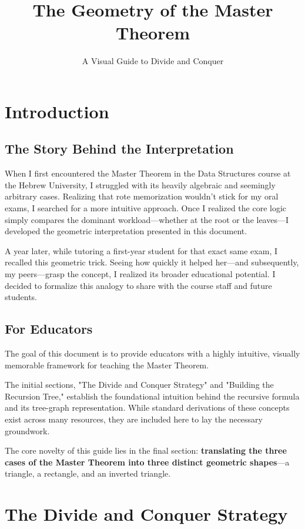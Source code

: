 \documentclass[11pt, a4paper]{article}
\title{\Huge \textbf{The Geometry of the Master Theorem}}
\author{A Visual Guide to Divide and Conquer}
\date{}
\begin{document}
\maketitle

\section*{Introduction}

\subsection*{The Story Behind the Interpretation}
When I first encountered the Master Theorem in the Data Structures course at the Hebrew University, I struggled with its heavily algebraic and seemingly arbitrary cases. Realizing that rote memorization wouldn't stick for my oral exams, I searched for a more intuitive approach. Once I realized the core logic simply compares the dominant workload—whether at the root or the leaves—I developed the geometric interpretation presented in this document.

A year later, while tutoring a first-year student for that exact same exam, I recalled this geometric trick. Seeing how quickly it helped her—and subsequently, my peers—grasp the concept, I realized its broader educational potential. I decided to formalize this analogy to share with the course staff and future students.

\subsection*{For Educators}
The goal of this document is to provide educators with a highly intuitive, visually memorable framework for teaching the Master Theorem. 

The initial sections, "The Divide and Conquer Strategy" and "Building the Recursion Tree," establish the foundational intuition behind the recursive formula and its tree-graph representation. While standard derivations of these concepts exist across many resources, they are included here to lay the necessary groundwork. 

The core novelty of this guide lies in the final section: \textbf{translating the three cases of the Master Theorem into three distinct geometric shapes}—a triangle, a rectangle, and an inverted triangle.

\newpage
\section*{The Divide and Conquer Strategy}
\end{document}
